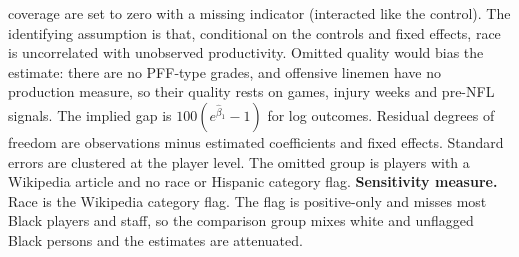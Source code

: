 \begin{table}[!h]
{\begin{threeparttable}
\begin{tablenotes}[para]
coverage are set to zero with a missing indicator (interacted like the control). The identifying assumption is that, conditional on the controls and fixed effects, race is uncorrelated with unobserved productivity. Omitted quality would bias the estimate: there are no PFF-type grades, and offensive linemen have no production measure, so their quality rests on games, injury weeks and pre-NFL signals. The implied gap is $100(e^{\hat\beta_1}-1)$ for log outcomes. Residual degrees of freedom are observations minus estimated coefficients and fixed effects. Standard errors are clustered at the player level. The omitted group is players with a Wikipedia article and no race or Hispanic category flag. \textbf{Sensitivity measure.} Race is the Wikipedia category flag. The flag is positive-only and misses most Black players and staff, so the comparison group mixes white and unflagged Black persons and the estimates are attenuated.
\end{tablenotes}
\end{threeparttable}}
\end{table}
